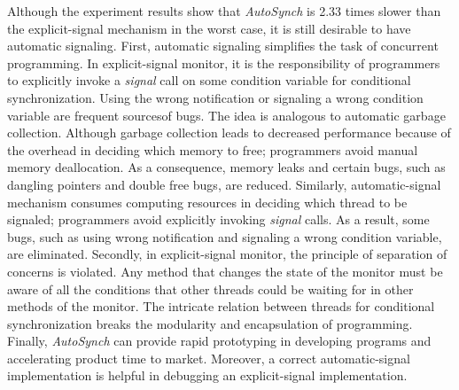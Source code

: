 \documentclass[preprint]{sigplanconf}
\begin{document}
Although the experiment results show that {\em AutoSynch} is 2.33 times slower than 
the explicit-signal mechanism in the worst case, it is still desirable to have automatic signaling.
First, automatic signaling simplifies the task of concurrent programming.
            In explicit-signal monitor, it is the responsibility of programmers to 
        explicitly invoke a {\em signal} call on some condition variable for
        conditional synchronization. Using the wrong notification or signaling
        a wrong condition variable are frequent sourcesof bugs.  The idea is analogous to automatic
        garbage collection.
Although garbage collection leads to decreased
performance because of the overhead in deciding which memory to free; programmers 
avoid manual memory deallocation. As a consequence, memory leaks and certain 
bugs, such as dangling pointers and double free bugs, are reduced. 
Similarly, automatic-signal mechanism consumes computing resources 
in deciding which thread to be signaled; programmers avoid explicitly invoking 
{\em signal} calls. As a result, some bugs, such as using wrong notification and
signaling a wrong condition variable, are eliminated.  Secondly,
 in explicit-signal monitor, the principle of separation of concerns is violated.
    Any method that changes the state of the monitor must be aware of all the conditions that other threads could be waiting for 
    in other methods of the monitor. 
     The intricate relation between
        threads for conditional synchronization breaks the modularity and 
        encapsulation of programming.  
   Finally,
  {\em AutoSynch} can provide  
        rapid prototyping  in developing programs and accelerating 
        product time to market. Moreover, 
        a correct
        automatic-signal implementation is helpful in debugging an
        explicit-signal implementation. 



\end{document}
